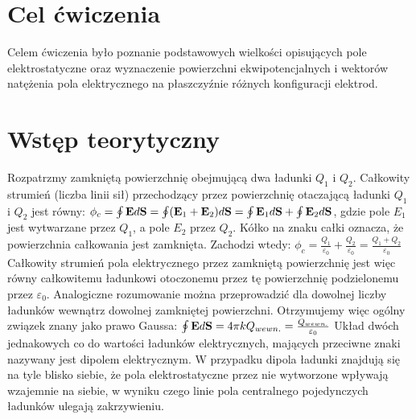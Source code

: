 \documentclass[12pt]{article}
\begin{document}
\tableofcontents \newpage
\section{Cel ćwiczenia}
Celem ćwiczenia było poznanie podstawowych wielkości opisujących pole elektrostatyczne oraz wyznaczenie powierzchni ekwipotencjalnych i wektorów natężenia pola elektrycznego na płaszczyźnie różnych konfiguracji elektrod.
\section{Wstęp teorytyczny}
Rozpatrzmy zamkniętą powierzchnię obejmującą dwa ładunki $Q_1$ i $Q_2$. Całkowity strumień (liczba linii sił) przechodzący przez powierzchnię otaczającą ładunki $Q_1$ i $Q_2$ jest równy: \newline \newline
{\Large $\phi_c=\oint\bold{E}d\bold{S}=\oint(\bold{E}_1+\bold{E}_2)d\bold{S}=\oint\bold{E}_1d\bold{S}+\oint\bold{E}_2d\bold{S}$}, \newline \newline
gdzie pole $E_1$ jest wytwarzane przez $Q_1$, a pole $E_2$ przez $Q_2$. Kółko na znaku całki oznacza, że powierzchnia całkowania jest zamknięta. Zachodzi wtedy: \newline \newline
{\Large $\phi_c=\frac{Q_1}{\varepsilon_0}+\frac{Q_2}{\varepsilon_0}=\frac{Q_1+Q_2}{\varepsilon_0}$} \newline \newline
Całkowity strumień pola elektrycznego przez zamkniętą powierzchnię jest więc równy całkowitemu ładunkowi otoczonemu przez tę powierzchnię podzielonemu przez $\varepsilon_0$. Analogiczne rozumowanie można przeprowadzić dla dowolnej liczby ładunków wewnątrz dowolnej zamkniętej powierzchni. Otrzymujemy więc ogólny związek znany jako prawo Gaussa: \newline \newline
{\Large $\oint\bold{E}d\bold{S}=4\pi{k}Q_{wewn.}=\frac{Q_{wewn.}}{\varepsilon_0}$} \newline \newline
Układ dwóch jednakowych co do wartości ładunków elektrycznych, mających przeciwne znaki nazywany jest dipolem elektrycznym. W przypadku dipola ładunki znajdują się na tyle blisko siebie, że pola elektrostatyczne przez nie wytworzone wpływają wzajemnie na siebie, w wyniku czego linie pola centralnego pojedynczych ładunków ulegają zakrzywieniu.\newline
\end{document}
